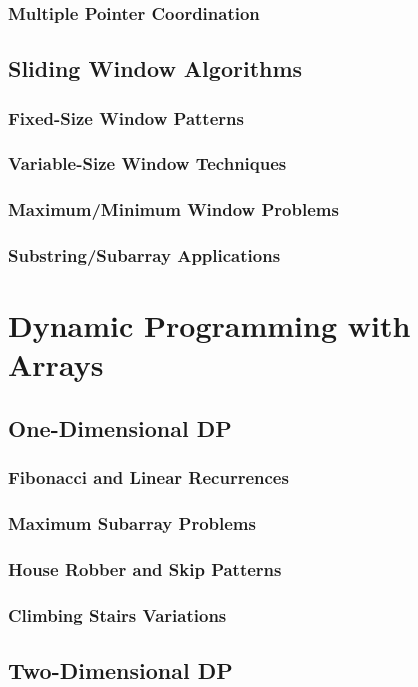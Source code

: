 \documentclass[12pt, oneside]{book}
\begin{document}
\subsubsection{Multiple Pointer Coordination}

\subsection{Sliding Window Algorithms}
\subsubsection{Fixed-Size Window Patterns}
\subsubsection{Variable-Size Window Techniques}
\subsubsection{Maximum/Minimum Window Problems}
\subsubsection{Substring/Subarray Applications}

\section{Dynamic Programming with Arrays}
\subsection{One-Dimensional DP}
\subsubsection{Fibonacci and Linear Recurrences}
\subsubsection{Maximum Subarray Problems}
\subsubsection{House Robber and Skip Patterns}
\subsubsection{Climbing Stairs Variations}

\subsection{Two-Dimensional DP}
\end{document}
